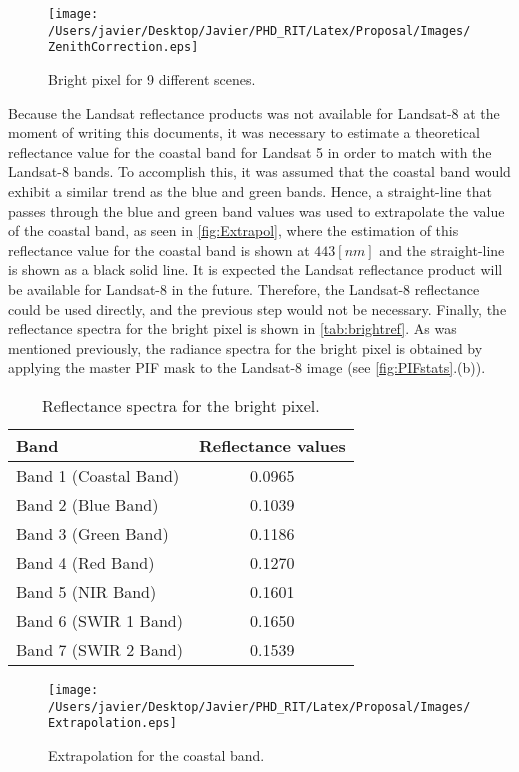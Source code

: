 \begin{figure}[htb]
  	\centering
  	\texttt{[image: /Users/javier/Desktop/Javier/PHD\_RIT/Latex/Proposal/Images/ZenithCorrection.eps]}
  \caption{Bright pixel for 9 different scenes. \label{fig:ZenithCorr} } 
\end{figure}
Because the Landsat reflectance products was not available for Landsat-8 at the moment of writing this documents, it was necessary to estimate a theoretical reflectance value for the coastal band for Landsat 5 in order to match with the Landsat-8 bands. To accomplish this, it was assumed that the coastal band would exhibit a similar trend as the blue and green bands. Hence, a straight-line that passes through the blue and green band values was used to extrapolate the value of the coastal band, as seen in \autoref{fig:Extrapol}, where the estimation of this reflectance value for the coastal band is shown at $443 [nm]$ and the straight-line is shown as a black solid line. It is expected the Landsat reflectance product will be available for Landsat-8 in the future. Therefore, the Landsat-8 reflectance could be used directly, and the previous step would not be necessary. Finally, the reflectance spectra for the bright pixel is shown in \autoref{tab:brightref}. As was mentioned previously, the radiance spectra for the bright pixel is obtained by applying the master PIF mask to the Landsat-8 image (see \autoref{fig:PIFstats}.(b)).

\begin{table}[htb]
\caption{ Reflectance spectra for the bright pixel. \label{tab:brightref} } 
\centering
\begin{tabular}{l|c} 
 \bfseries{Band} & \bfseries{Reflectance values}\\ \hline \hline
 Band 1 (Coastal Band) &  0.0965 \\
 Band 2 (Blue Band) &  0.1039 \\
 Band 3 (Green Band) &  0.1186 \\
 Band 4 (Red Band) &  0.1270 \\
 Band 5 (NIR Band) &  0.1601 \\
 Band 6 (SWIR 1 Band) &  0.1650 \\ 
 Band 7 (SWIR 2 Band) &  0.1539 \\ 
 \end{tabular}
\end{table}

\begin{figure}[htb]
  	\centering
  	\texttt{[image: /Users/javier/Desktop/Javier/PHD\_RIT/Latex/Proposal/Images/Extrapolation.eps]}
  \caption{Extrapolation for the coastal band. \label{fig:Extrapol} } 
\end{figure}

